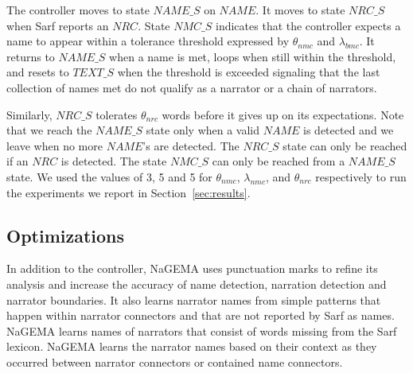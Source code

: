 \documentclass{llncs}
\begin{document}
The controller moves to state $\mathit{NAME\_S}$ on
$\mathit{NAME}$.
It moves to state $\mathit{NRC\_S}$ 
when Sarf reports an $\mathit{NRC}$.
State $\mathit{NMC\_S}$
indicates that the controller expects a name to appear within 
a tolerance threshold expressed by 
$\theta_{\mathit{nmc}}$ and $\lambda_{\mathit{bmc}}$.
It returns to $\mathit{NAME\_S}$ when a name is met, 
loops when still within the threshold, and 
resets to $\mathit{TEXT\_S}$ when the threshold is exceeded 
signaling that the last collection of names met do not qualify
as a narrator or a chain of narrators. 

Similarly, $\mathit{NRC\_S}$ tolerates $\theta_{\mathit{nrc}}$ words 
before it gives up on its expectations. 
Note that we reach the $\mathit{NAME\_S}$
state only when a
valid $\mathit{NAME}$ is detected and we leave when no 
more $\mathit{NAME}$'s are detected.
The $\mathit{NRC\_S}$ state can only be reached if an 
$\mathit{NRC}$ is detected.
The state $\mathit{NMC\_S}$ can only be reached from a 
$\mathit{NAME\_S}$ state.
We used the values of 3, 5 and 5 for $\theta_{\mathit{nmc}}$, 
$\lambda_{\mathit{nmc}}$, and 
$\theta_{\mathit{nrc}}$ respectively to run the experiments 
we report in Section~\ref{sec:results}.

\begin{figure}[tb!]
\end{figure}


\subsection{Optimizations}

In addition to the controller, 
NaGEMA uses punctuation marks to refine its analysis and 
increase the accuracy of name detection, narration detection and narrator boundaries. 
It also learns narrator names from simple patterns that 
happen within narrator connectors and that are not 
reported by Sarf as names. 
NaGEMA learns names of narrators that consist of words missing from 
the Sarf lexicon.
NaGEMA learns the narrator names based on their context as they occurred 
between narrator connectors or contained name connectors. 
\end{document}

